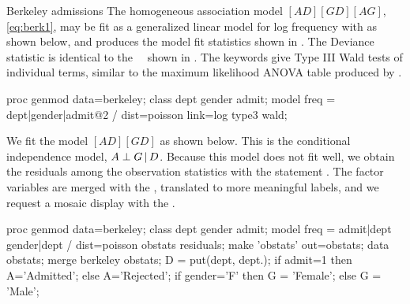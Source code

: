 \begin{Example}[berkeley6]{Berkeley admissions}
The homogeneous association model $[AD] [GD] [AG]$, \eqref{eq:berk1}, may be fit as a generalized linear
model for log frequency with  as shown below, and produces the model fit
statistics shown in .  The Deviance statistic is identical to
the \LR\ \GSQ\ shown in .
The keywords  give Type III Wald tests of individual terms,
similar to the maximum likelihood ANOVA table produced by .
\begin{listing}
proc genmod data=berkeley;
   class dept gender admit;
   model freq = dept|gender|admit@2 / dist=poisson link=log type3 wald;
\end{listing}

\begin{Output}[htb]
\caption{Berkeley admissions data: Model [AD] [AG] [DG], fit with }\label{out:genberk2.1}
\small

\end{Output}

We fit the model $[AD] [GD]$ as shown below.
This is the conditional independence model, $A \perp G \, | \, D$.  Because this model does not
fit well, we obtain the residuals among the observation statistics
with the statement .
The factor variables  are merged with the  \Dset,
translated to more meaningful labels, and
we request a mosaic display with the .
\begin{listing}
proc genmod data=berkeley;
   class dept gender admit;
   model freq = admit|dept gender|dept / dist=poisson obstats residuals;
   make 'obstats' out=obstats;
data obstats;
   merge berkeley obstats;
   D = put(dept, dept.);
   if admit=1
      then A='Admitted';
      else A='Rejected';
   if gender='F'
      then G = 'Female';
      else G = 'Male';


\end{listing}
\end{Example}
